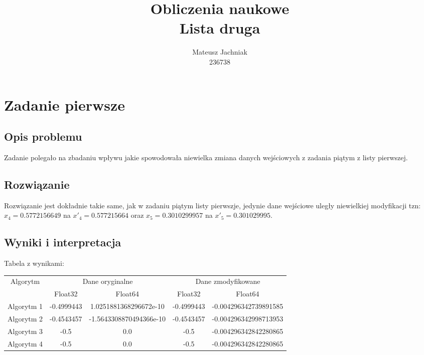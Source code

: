 \documentclass[8pt,letterpaper]{article}
\begin{document}
\title{Obliczenia naukowe \protect\\  \normalsize Lista druga}

\author{Mateusz Jachniak \protect\\ \normalsize 236738}
\maketitle

\section{Zadanie pierwsze}
  
\subsection{Opis problemu}

\hspace{1.0 cm} Zadanie polegało na zbadaniu wpływu jakie spowodowała niewielka zmiana danych wejściowych z zadania piątym z listy pierwszej.
 
\subsection{Rozwiązanie}
\hspace{1.0 cm} Rozwiązanie jest dokładnie takie same, jak w zadaniu piątym listy pierwszje, jedynie dane wejściowe uległy niewielkiej modyfikacji tzn: $x_4 = 0.5772156649$ na $x'_4=0.577215664$ oraz $x_5 = 0.3010299957$ na $x'_5 = 0.301029995$.

\subsection{Wyniki i interpretacja}

\begin{center}
Tabela z wynikami:
\\
\begin{tabular}{|c|c|c|c|c|}
\hline
\multirow{2}{*}{Algorytm}   & \multicolumn{2}{c|}{Dane oryginalne} & \multicolumn{2}{c|}{Dane zmodyfikowane} \\
                            \cline{2-5}
                            & Float32 & Float64 & Float32 & Float64\\
\hline
\hline
Algorytm 1 & -0.4999443 & 1.0251881368296672e-10 & -0.4999443 & 	-0.004296342739891585\\

Algorytm 2 & -0.4543457 & -1.5643308870494366e-10 & -0.4543457 & -0.004296342998713953\\

Algorytm 3 & -0.5 & 0.0 & -0.5 & -0.004296342842280865\\

Algorytm 4 & -0.5 & 0.0 & -0.5 & -0.004296342842280865\\
\hline

\end{tabular}
\end{center}
\end{document}
